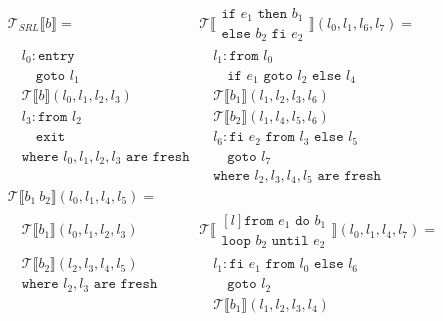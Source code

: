 \begin{figure}[H]
  $$\begin{aligned}
    & \mathcal{T}_{SRL}\llbracket b\rrbracket =        &  \quad  & \mathcal{T}\llbracket\begin{matrix}\texttt{if }e_1\texttt{ then }b_1\\\texttt{else }b_2\texttt{ fi }e_2\end{matrix}\rrbracket(l_0,l_1,l_6,l_7) = \\
    & \quad l_0: \texttt{entry}                          &         & \quad l_1:  \texttt{from }l_0 \\
    & \quad \quad \texttt{goto }l_1                      &         & \quad \quad \texttt{if }e_1\texttt{ goto }l_2\texttt{ else }l_4\\
    & \quad \mathcal{T}\llbracket b\rrbracket(l_0,l_1,l_2,l_3) & & \quad \mathcal{T}\llbracket b_1\rrbracket(l_1,l_2,l_3,l_6)\\
    & \quad l_3: \texttt{from }l_2                       &         & \quad \mathcal{T}\llbracket b_2\rrbracket(l_1,l_4,l_5,l_6)\\
    & \quad \quad \texttt{exit}                          &         & \quad l_6: \texttt{fi }e_2\texttt{ from }l_3\texttt{ else }l_5\\
    & \quad \texttt{where $l_0,l_1,l_2,l_3$ are fresh}   &         & \quad \quad \texttt{goto }l_7\\
    &                                                  &         & \quad \texttt{where $l_2,l_3,l_4,l_5$ are fresh}\\
    & \mathcal{T}\llbracket b_1\ b_2\rrbracket(l_0,l_1,l_4,l_5) = \\
    & \quad \mathcal{T}\llbracket b_1\rrbracket(l_0,l_1,l_2,l_3) & & \mathcal{T}\llbracket\begin{matrix*}[l]\texttt{from }e_1\texttt{ do }b_1\\\texttt{loop }b_2\texttt{ until }e_2\end{matrix*}\rrbracket(l_0,l_1,l_4,l_7) = \\
    & \quad \mathcal{T}\llbracket b_2\rrbracket(l_2,l_3,l_4,l_5) & & \quad l_1: \texttt{fi }e_1\texttt{ from }l_0\texttt{ else }l_6\\
    & \quad \texttt{where $l_2,l_3$ are fresh}                     & & \quad \quad \texttt{goto }l_2\\
    &                                                            & & \quad \mathcal{T}\llbracket b_1\rrbracket(l_1,l_2,l_3,l_4)\\

\end{aligned}$$
\end{figure}
